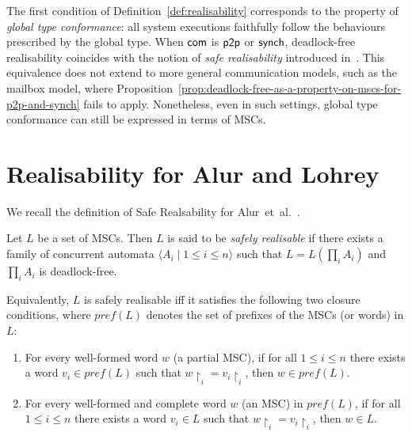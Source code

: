 The first condition of Definition~\ref{def:realisability} corresponds to  
the property of \emph{global type conformance}: all system executions 
faithfully follow the behaviours prescribed by the global type.
When $\mathsf{com}$ is $\mathsf{p2p}$ or $\mathsf{synch}$, 
deadlock-free realisability coincides with the notion of 
\emph{safe realisability} introduced in~\cite{alur2005realizability}.
This equivalence does not extend to more general communication models, 
such as the mailbox model, where 
Proposition~\ref{prop:deadlock-free-as-a-property-on-mscs-for-p2p-and-synch} 
fails to apply. Nonetheless, even in such settings, global type 
conformance can still be expressed in terms of MSCs.


\section{Realisability for Alur and Lohrey}
We recall the definition of Safe Realsability for 
Alur~et~al.~\cite{alur2005realizability}.

\bigskip

\begin{definition}
Let $L$ be a set of MSCs. Then $L$ is said to be \emph{safely realisable}
if there exists a family of concurrent automata 
$\langle A_i \mid 1 \leq i \leq n \rangle$ such that
$ L = L(\prod_i A_i)$ and 
$\prod_i A_i$ is deadlock-free.

Equivalently, $L$ is safely realisable iff it satisfies the following two
closure conditions, where $\mathit{pref}(L)$ denotes the set of prefixes 
of the MSCs (or words) in $L$:
\begin{enumerate}
  \item For every well-formed word $w$ (a partial MSC), if for all 
  $1 \leq i \leq n$ there exists a word $v_i \in \mathit{pref}(L)$ 
  such that $w{\upharpoonright_i} = v_i{\upharpoonright_i}$, then 
  $w \in \mathit{pref}(L)$.
  \item For every well-formed and complete word $w$ (an MSC) in 
  $\mathit{pref}(L)$, if for all $1 \leq i \leq n$ there exists a 
  word $v_i \in L$ such that $w{\upharpoonright_i} = v_i{\upharpoonright_i}$, 
  then $w \in L$.
\end{enumerate}
\end{definition}


